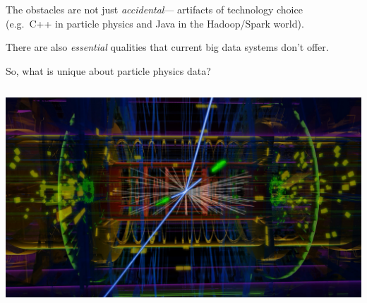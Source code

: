 \documentclass[aspectratio=169]{beamer}
\begin{document}
\begin{frame}{}
\vspace{1 cm}
\large
\begin{center}
The obstacles are not just {\it accidental}--- artifacts of technology choice \\ (e.g.\ C++ in particle physics and Java in the Hadoop/Spark world).

\vspace{1 cm}
There are also {\it essential} qualities that current big data systems don't offer.

\vspace{1 cm}
\end{center}
\end{frame}

\begin{frame}{So, what is unique about particle physics data?}

\begin{columns}
\vspace{0.11 cm}
\includegraphics[width=\linewidth]{complex-atlas-collision-art.jpg}
\end{columns}

\vspace{-8.7 cm}

\vspace{0.5 cm}

\vspace{3.9 cm}

\vspace{8.7 cm}
\end{frame}
\end{document}
